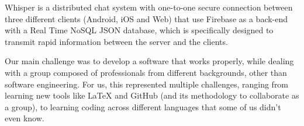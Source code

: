 Whisper is a distributed chat system with one-to-one secure connection between three different clients (Android, iOS and Web) that use Firebase as a back-end with a Real Time NoSQL JSON database, which is specifically designed to transmit rapid information between the server and the clients.

Our main challenge was to develop a software that works properly, while dealing with a group composed of professionals from different backgrounds, other than software engineering. For us, this represented multiple challenges, ranging from learning new tools like \LaTeX{} and GitHub (and its methodology to collaborate as a group), to learning coding across different languages that some of us didn't even know.















